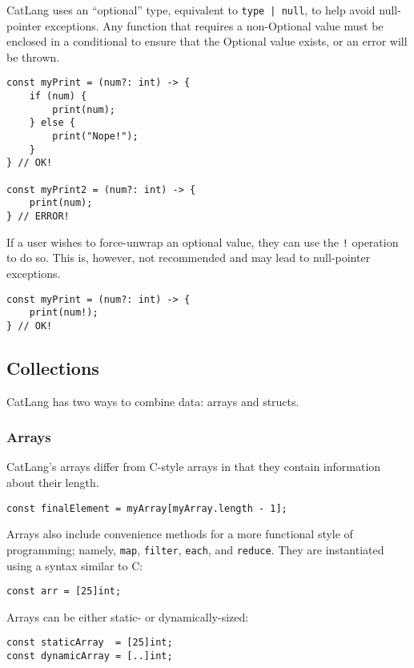 \documentclass[12pt]{article}
\begin{document}
CatLang uses an ``optional'' type, equivalent to \lstinline!type | null!, to help avoid null-pointer exceptions. Any function that requires a non-Optional value must be enclosed in a conditional to ensure that the Optional value exists, or an error will be thrown.

\begin{lstlisting}
const myPrint = (num?: int) -> {
	if (num) {
		print(num);
	} else {
		print("Nope!");
	}
} // OK!

const myPrint2 = (num?: int) -> {
	print(num);
} // ERROR!
\end{lstlisting}

If a user wishes to force-unwrap an optional value, they can use the \lstinline$!$ operation to do so. This is, however, not recommended and may lead to null-pointer exceptions.

\begin{lstlisting}
const myPrint = (num?: int) -> {
	print(num!);
} // OK!
\end{lstlisting}

\subsection{Collections}

CatLang has two ways to combine data: arrays and structs.

\subsubsection{Arrays}

CatLang's arrays differ from C-style arrays in that they contain information about their length.

\begin{lstlisting}
const finalElement = myArray[myArray.length - 1];
\end{lstlisting}

Arrays also include convenience methods for a more functional style of programming; namely, \lstinline!map!, \lstinline!filter!, \lstinline!each!, and \lstinline!reduce!. They are instantiated using a syntax similar to C:

\begin{lstlisting}
const arr = [25]int;
\end{lstlisting}

Arrays can be either static- or dynamically-sized:

\begin{lstlisting}
const staticArray  = [25]int;
const dynamicArray = [..]int;
\end{lstlisting}
\end{document}
